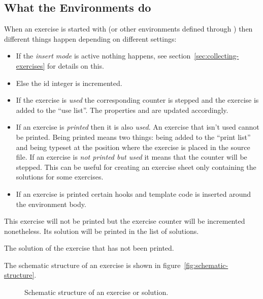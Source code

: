 \documentclass{xsim-manual}
\begin{document}
\subsection{What the Environments do}

When an exercise is started with  (or other environments
defined through ) then different things happen
depending on different settings:
\begin{itemize}
  \item If the \emph{insert mode} is active nothing happens, see
    section~\vref{sec:collecting-exercises} for details on this.
  \item Else the id integer is incremented.
  \item If the exercise is \emph{used} the corresponding counter is stepped
    and the exercise is added to the \enquote{use list}.  The properties
     and  are updated accordingly.
  \item If an exercise is \emph{printed} then it is also \emph{used}. An
    exercise that isn't used cannot be printed.  Being printed means two
    things: being added to the \enquote{print list} and being typeset at the
    position where the exercise is placed in the source file.  If an exercise
    is \emph{not printed but used} it means that the counter will be stepped.
    This can be useful for creating an exercise sheet only containing the
    solutions for some exercises.
  \item If an exercise is printed certain hooks and template code is inserted
    around the environment body.
\end{itemize}

\begin{example}
  \begin{exercise}[print=false]
    This exercise will not be printed but the exercise counter will be
    incremented nonetheless. Its solution will be printed in the list of
    solutions.
  \end{exercise}
  \begin{solution}
    The solution of the exercise that has not been printed.
  \end{solution}
\end{example}

The schematic structure of an exercise is shown in
figure~\vref{fig:schematic-structure}.

\begin{figure}
  \centering
  \caption{Schematic structure of an exercise or solution.}\label{fig:schematic-structure} 
\end{figure}
\end{document}

